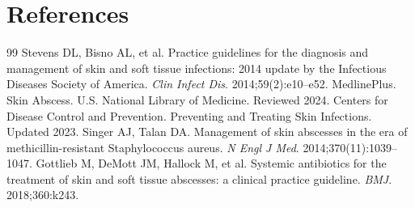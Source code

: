 \section*{References}
\begin{thebibliography}{99}
 Stevens DL, Bisno AL, et al. Practice guidelines for the diagnosis and management of skin and soft tissue infections: 2014 update by the Infectious Diseases Society of America. \textit{Clin Infect Dis}. 2014;59(2):e10--e52.
 MedlinePlus. Skin Abscess. U.S. National Library of Medicine. Reviewed 2024.
 Centers for Disease Control and Prevention. Preventing and Treating Skin Infections. Updated 2023.
 Singer AJ, Talan DA. Management of skin abscesses in the era of methicillin-resistant Staphylococcus aureus. \textit{N Engl J Med}. 2014;370(11):1039--1047.
 Gottlieb M, DeMott JM, Hallock M, et al. Systemic antibiotics for the treatment of skin and soft tissue abscesses: a clinical practice guideline. \textit{BMJ}. 2018;360:k243.
\end{thebibliography}
